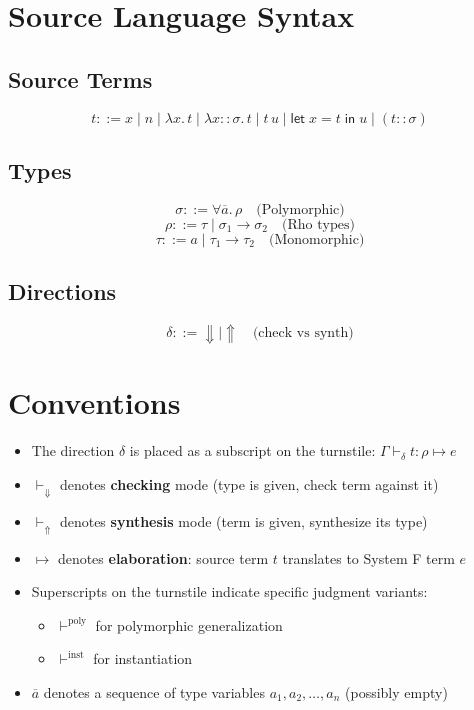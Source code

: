 \documentclass[11pt,a4paper]{article}
\begin{document}
\section{Source Language Syntax}

\subsection{Source Terms}
\[
t ::= x \mid n \mid \lambda x.\,t \mid \lambda x\!::\!\sigma.\,t \mid t\,u \mid \textsf{let}\;x = t\;\textsf{in}\;u \mid (t :: \sigma)
\]

\subsection{Types}
\[
\sigma ::= \forall \overline{a}.\,\rho \quad \text{(Polymorphic)}
\]
\[
\rho ::= \tau \mid \sigma_1 \rightarrow \sigma_2 \quad \text{(Rho types)}
\]
\[
\tau ::= a \mid \tau_1 \rightarrow \tau_2 \quad \text{(Monomorphic)}
\]

\subsection{Directions}
\[
\delta ::= \Downarrow \mid \Uparrow \quad \text{(check vs synth)}
\]

\section{Conventions}

\begin{itemize}
\item The direction $\delta$ is placed as a subscript on the turnstile: $\Gamma \vdash_\delta t : \rho \mapsto e$
\item $\vdash_\Downarrow$ denotes \textbf{checking} mode (type is given, check term against it)
\item $\vdash_\Uparrow$ denotes \textbf{synthesis} mode (term is given, synthesize its type)
\item $\mapsto$ denotes \textbf{elaboration}: source term $t$ translates to System F term $e$
\item Superscripts on the turnstile indicate specific judgment variants:
\begin{itemize}
\item $\vdash^{\text{poly}}$ for polymorphic generalization
\item $\vdash^{\text{inst}}$ for instantiation
\end{itemize}
\item $\overline{a}$ denotes a sequence of type variables $a_1, a_2, \ldots, a_n$ (possibly empty)
\end{itemize}
\end{document}
